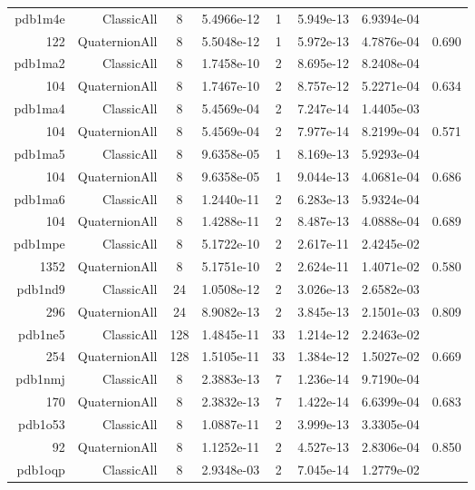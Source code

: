 \begin{xltabular}{\textwidth}{r|rcS[table-format=1.4e+2]cS[table-format=1.3e+2]S[table-format=1.4e+2]S[table-format=-1.3]}
pdb1m4e & ClassicAll & 8 & 5.4966e-12 & 1 & 5.949e-13 & 6.9394e-04 & \\
122 & QuaternionAll & 8 & 5.5048e-12 & 1 & 5.972e-13 & 4.7876e-04 & 0.690\\  \addlinespace
pdb1ma2 & ClassicAll & 8 & 1.7458e-10 & 2 & 8.695e-12 & 8.2408e-04 & \\
104 & QuaternionAll & 8 & 1.7467e-10 & 2 & 8.757e-12 & 5.2271e-04 & 0.634\\  \addlinespace
pdb1ma4 & ClassicAll & 8 & 5.4569e-04 & 2 & 7.247e-14 & 1.4405e-03 & \\
104 & QuaternionAll & 8 & 5.4569e-04 & 2 & 7.977e-14 & 8.2199e-04 & 0.571\\  \addlinespace
pdb1ma5 & ClassicAll & 8 & 9.6358e-05 & 1 & 8.169e-13 & 5.9293e-04 & \\
104 & QuaternionAll & 8 & 9.6358e-05 & 1 & 9.044e-13 & 4.0681e-04 & 0.686\\  \addlinespace
pdb1ma6 & ClassicAll & 8 & 1.2440e-11 & 2 & 6.283e-13 & 5.9324e-04 & \\
104 & QuaternionAll & 8 & 1.4288e-11 & 2 & 8.487e-13 & 4.0888e-04 & 0.689\\  \addlinespace
pdb1mpe & ClassicAll & 8 & 5.1722e-10 & 2 & 2.617e-11 & 2.4245e-02 & \\
1352 & QuaternionAll & 8 & 5.1751e-10 & 2 & 2.624e-11 & 1.4071e-02 & 0.580\\  \addlinespace
pdb1nd9 & ClassicAll & 24 & 1.0508e-12 & 2 & 3.026e-13 & 2.6582e-03 & \\
296 & QuaternionAll & 24 & 8.9082e-13 & 2 & 3.845e-13 & 2.1501e-03 & 0.809\\  \addlinespace
pdb1ne5 & ClassicAll & 128 & 1.4845e-11 & 33 & 1.214e-12 & 2.2463e-02 & \\
254 & QuaternionAll & 128 & 1.5105e-11 & 33 & 1.384e-12 & 1.5027e-02 & 0.669\\  \addlinespace
pdb1nmj & ClassicAll & 8 & 2.3883e-13 & 7 & 1.236e-14 & 9.7190e-04 & \\
170 & QuaternionAll & 8 & 2.3832e-13 & 7 & 1.422e-14 & 6.6399e-04 & 0.683\\  \addlinespace
pdb1o53 & ClassicAll & 8 & 1.0887e-11 & 2 & 3.999e-13 & 3.3305e-04 & \\
92 & QuaternionAll & 8 & 1.1252e-11 & 2 & 4.527e-13 & 2.8306e-04 & 0.850\\  \addlinespace
pdb1oqp & ClassicAll & 8 & 2.9348e-03 & 2 & 7.045e-14 & 1.2779e-02 & \\

\end{xltabular}
